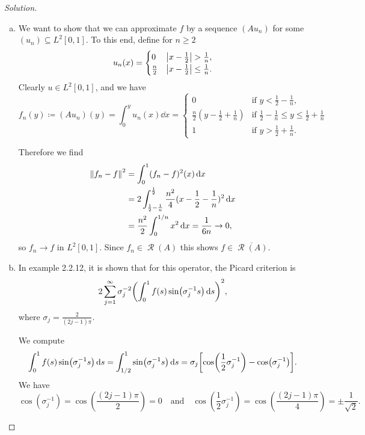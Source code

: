 \documentclass{article}
\theoremstyle{plain}
\theoremstyle{remark}
\newenvironment{solution}{\begin{proof}[Solution]\renewcommand\qedsymbol{}}{\end{proof}}
\newcommand{\Cal}{\mathcal}
\newcommand\ceq\coloneqq %
\newcommand\clos\overline
\DeclareMathOperator\Ran{\Cal R}
\begin{document}
\begin{solution}
	\begin{enumerate}[(a)]
		\item We want to show that we can approximate $f$ by a sequence $(Au_n)$ for some $(u_n) \subseteq L^2[0,1]$. To this end, define for $n \geq 2$
		\[
		u_n(x) =
		\begin{cases}
			0 &\abs{x - \frac12} > \frac1n, \\
			\frac n2 &\abs{x - \frac12} \leq \frac1n. 
		\end{cases}
		\]
		Clearly $u \in L^2[0, 1]$, and we have
		\[
		f_n(y) \ceq (Au_n)(y) = \int_0^y u_n(x) \dd{x} = \begin{cases}
			0 &\text{if $y < \frac12 - \frac1n$,}\\
			\frac n2(y - \frac12 + \frac1n) &\text{if $\frac12 - \frac1n \leq y \leq \frac12 + \frac1n$} \\
			1 &\text{if $y > \frac12 + \frac1n$}. 
		\end{cases}
		\]
		
		Therefore we find
		\begin{align*}
			\norm{f_n - f}^2 &= \int_0^1 (f_n - f)^2(x) \dd{x} \\
			&= 2 \int_{\frac12 - \frac1n}^{\frac12} \frac{n^2}{4} (x - \frac12 - \frac1n)^2 \dd{x} \\
			&= \frac{n^2}{2} \int_0^{1/n}  x^2 \dd{x} = \frac{1}{6n} \to 0, 
		\end{align*}
	so $f_n \to f$ in $L^2[0, 1]$. Since $f_n \in \Ran(A)$ this shows $f \in \clos{\Ran(A)}$. 
	

	\item 	In example 2.2.12, it is shown that for this operator, the Picard criterion is
	\begin{equation} \label{eq:picard}
	2\sum_{j=1}^\infty  \sigma_j^{-2} \qty(\int_0^1 f(s) \sin(\sigma_j^{-1} s) \dd{s})^2,
	\end{equation}
	where $\sigma_j = \frac2{(2j - 1)\pi}$.
	
	We compute
	\[
	\int_0^1 f(s) \sin(\sigma_j^{-1} s) \dd{s} = \int_{1/2}^1 \sin(\sigma_j^{-1} s) \dd{s} = \sigma_j \qty[ \cos(\frac12 \sigma_j^{-1}) - \cos(\sigma_j^{-1})]. 
	\]
	We have
	\[
	\cos(\sigma_j^{-1}) = \cos(\frac{(2j - 1)\pi}{2}) = 0 \quad\text{and}\quad \cos(\frac12\sigma_j^{-1}) = \cos(\frac{(2j-1)\pi}{4}) = \pm\frac1{\sqrt2 }. 
	\]
	

\end{enumerate}
\end{solution}
\end{document}
